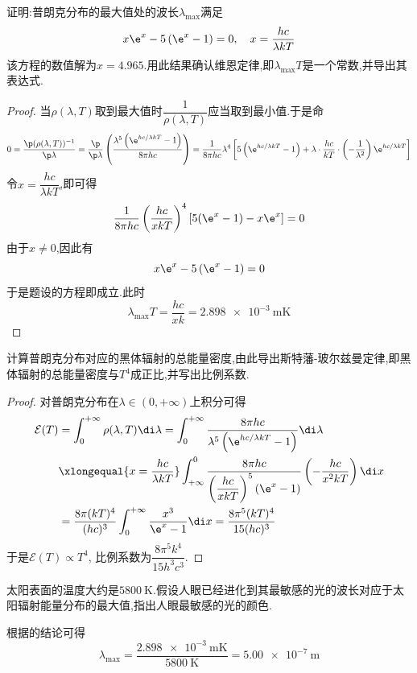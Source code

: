 \documentclass{ctexart}
\begin{document}
\begin{homework}[3.]
    证明:普朗克分布的最大值处的波长$\lambda_{\max}$满足
    \[x\e^x-5\left(\e^x-1\right)=0,\quad x=\dfrac{hc}{\lambda kT}\]
    该方程的数值解为$x=4.965$.用此结果确认维恩定律,即$\lambda_{\max}T$是一个常数,并导出其表达式.
\end{homework}
\begin{proof}
    当$\rho(\lambda,T)$取到最大值时$\dfrac{1}{\rho(\lambda,T)}$应当取到最小值.于是命
    \[0=\dfrac{\p(\rho(\lambda,T))^{-1}}{\p\lambda}=\dfrac{\p}{\p\lambda}\left(\dfrac{\lambda^5\left(\e^{hc/\lambda kT}-1\right)}{8\pi hc}\right)=\dfrac{1}{8\pi hc}\lambda^4\left[5\left(\e^{hc/\lambda kT}-1\right)+\lambda\cdot\dfrac{hc}{kT}\cdot\left(-\dfrac{1}{\lambda^2}\right)\e^{hc/\lambda kT}\right]\]
    令$x=\dfrac{hc}{\lambda kT}$,即可得
    \[\dfrac{1}{8\pi hc}\left(\dfrac{hc}{xkT}\right)^4\left[5(\e^x-1)-x\e^x\right]=0\]
    由于$x\neq0$,因此有
    \[x\e^x-5\left(\e^x-1\right)=0\]
    于是题设的方程即成立.此时
    \[\lambda_{\max}T=\dfrac{hc}{xk}=\SI{2.898e-3}{\meter\kelvin}\]
\end{proof}
\begin{homework}[4.]
    计算普朗克分布对应的黑体辐射的总能量密度,由此导出斯特藩-玻尔兹曼定律,即黑体辐射的总能量密度与$T^4$成正比,并写出比例系数.
\end{homework}
\begin{proof}
    对普朗克分布在$\lambda\in(0,+\infty)$上积分可得
    \[\begin{aligned}
        \mathcal{E}(T)
        &=\int_{0}^{+\infty}\rho(\lambda,T)\di\lambda=\int_{0}^{+\infty}\dfrac{8\pi hc}{\lambda^5\left(\e^{hc/\lambda kT}-1\right)}\di\lambda\\
        &\xlongequal{x=\frac{hc}{\lambda kT}}\int_{+\infty}^{0}\dfrac{8\pi hc}{\left(\dfrac{hc}{xkT}\right)^5\left(\e^x-1\right)}\left(-\dfrac{hc}{x^2kT}\right)\di x\\
        &=\dfrac{8\pi (kT)^4}{(hc)^3}\int_{0}^{+\infty}\dfrac{x^3}{\e^x-1}\di x=\dfrac{8\pi^5(kT)^4}{15(hc)^3}
    \end{aligned}\]
    于是$\mathcal{E}(T)\propto T^4$, 比例系数为$\dfrac{8\pi^5k^4}{15h^3c^3}$.
\end{proof}
\begin{homework}[5.]
    太阳表面的温度大约是$\SI{5800}{\kelvin}$.假设人眼已经进化到其最敏感的光的波长对应于太阳辐射能量分布的最大值,指出人眼最敏感的光的颜色.
\end{homework}
\begin{solution}
    根据的结论可得
    \[\lambda_{\max}=\dfrac{\SI{2.898e-3}{\meter\kelvin}}{\SI{5800}{\kelvin}}=\SI{5.00e-7}{\meter}\]
\end{solution}
\end{document}

